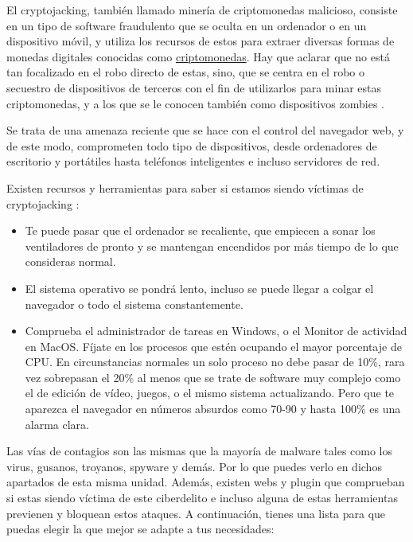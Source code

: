 \documentclass[
  a4paper,
  openany]{book}
\begin{document}
El cryptojacking, también llamado minería de criptomonedas malicioso, consiste en un tipo de software fraudulento que se oculta en un ordenador o en un dispositivo móvil, y utiliza los recursos de estos para extraer diversas formas de monedas digitales conocidas como \href{https://es.wikipedia.org/wiki/Criptomoneda}{criptomonedas}. Hay que aclarar que no está tan focalizado en el robo directo de estas, sino, que se centra en el robo o secuestro de dispositivos de terceros con el fin de utilizarlos para minar estas criptomonedas, y a los que se le conocen también como dispositivos zombies \citep{cryptojacking}.

Se trata de una amenaza reciente que se hace con el control del navegador web, y de este modo, comprometen todo tipo de dispositivos, desde ordenadores de escritorio y portátiles hasta teléfonos inteligentes e incluso servidores de red.

Existen recursos y herramientas para saber si estamos siendo víctimas de cryptojacking \citep{GEN-guia-cryptojacking}:

\begin{itemize}
\item
  Te puede pasar que el ordenador se recaliente, que empiecen a sonar los ventiladores de pronto y se mantengan encendidos por más tiempo de lo que consideras normal.
\item
  El sistema operativo se pondrá lento, incluso se puede llegar a colgar el navegador o todo el sistema constantemente.
\item
  Comprueba el administrador de tareas en Windows, o el Monitor de actividad en MacOS. Fíjate en los procesos que estén ocupando el mayor porcentaje de CPU. En circunstancias normales un solo proceso no debe pasar de 10\%, rara vez sobrepasan el 20\% al menos que se trate de software muy complejo como el de edición de vídeo, juegos, o el mismo sistema actualizando. Pero que te aparezca el navegador en números absurdos como 70-90 y hasta 100\% es una alarma clara.
\end{itemize}

Las vías de contagios son las mismas que la mayoría de malware tales como los virus, gusanos, troyanos, spyware y demás. Por lo que puedes verlo en dichos apartados de esta misma unidad. Además, existen webs y plugin que comprueban si estas siendo víctima de este ciberdelito e incluso alguna de estas herramientas previenen y bloquean estos ataques. A continuación, tienes una lista para que puedas elegir la que mejor se adapte a tus necesidades:
\end{document}
